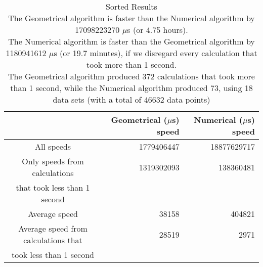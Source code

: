 \begin{table}[bth!]\footnotesize
 \begin{tabular}[3]{c|r|r}
 & Geometrical ($\mu$s) speed & Numerical ($\mu$s) speed\\
\hline
All speeds & 1779406447 & 18877629717 \\ 
\hline 
Only speeds from calculations & 1319302093 & 138360481 \\ 
that took less than 1 second & & \\ 
\hline
Average speed & 38158 & 404821 \\
\hline
Average speed from calculations that & 28519 & 2971 \\ 
took less than 1 second & & \\ 
\end{tabular}\\ \\
\caption{Sorted  Results\\
The Geometrical algorithm is faster than the Numerical algorithm by 17098223270 $\mu$s (or 4.75 hours).\\
The Numerical algorithm is faster than the Geometrical algorithm by 1180941612 $\mu$s (or 19.7 minutes), if we disregard every calculation that took more than 1 second.\\
The Geometrical algorithm produced 372 calculations that took more than 1 second, while the Numerical algorithm produced 73, using 18 data sets (with a total of 46632 data points)\\
}\label{total-normal_speedtable}\end{table}